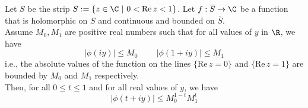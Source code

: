 \begin{lemma}
    \label{lem:threelines}
    \uses{}
    Let $S$ be the strip $S:=\{z \in \C \ | \ 0 < \mathrm{Re} \, z < 1 \}$. Let $f: \overline{S} \to \C$
    be a function that is holomorphic on $S$ and continuous and bounded on $\overline{S}$.\\
    Assume $M_0, M_1$ are positive real numbers such that for all values of $y$ in $\R$, we have
    \[| \phi(iy) | \leq M_0 \ \qquad | \phi(1+iy) | \leq M_1 \]
    i.e., the absolute values of the function on the lines $\{\mathrm{Re} \, z = 0\}$ and $\{\mathrm{Re} \, z = 1\}$ are bounded by $M_0$ and $M_1$ respectively.\\
    Then, for all $0 \leq t \leq 1$ and for all real values of $y$, we have
    \[  | \phi(t + iy) | \leq M_0^{1-t} M_1^t\]
\end{lemma}
